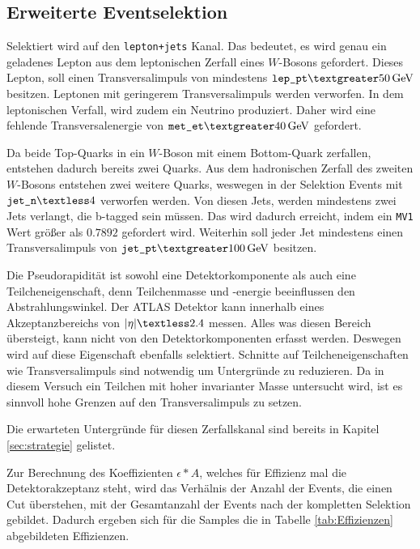 \subsection{Erweiterte Eventselektion}
\label{sec:aufgabe3}

Selektiert wird auf den \texttt{lepton+jets} Kanal. Das bedeutet, es wird genau 
ein geladenes Lepton aus dem leptonischen Zerfall eines $W$-Bosons gefordert. 
Dieses Lepton, soll einen Transversalimpuls von mindestens $\texttt{lep$\_$pt} \textgreater 
\SI{50}{\giga\electronvolt}$ besitzen. Leptonen mit geringerem Transversalimpuls 
werden verworfen. In dem leptonischen Verfall, wird zudem ein 
Neutrino produziert. Daher wird eine fehlende Transversalenergie von 
$\texttt{met$\_$et} \textgreater \SI{40}{\giga\electronvolt}$ gefordert. \par 
Da beide Top-Quarks in ein $W$-Boson mit einem Bottom-Quark zerfallen, entstehen
dadurch bereits zwei Quarks. Aus dem hadronischen Zerfall des zweiten $W$-Bosons 
entstehen zwei weitere Quarks, weswegen in der Selektion Events mit 
$\texttt{jet$\_$n} \textless 4$ verworfen werden. Von diesen Jets, werden 
mindestens zwei Jets verlangt, die b-tagged sein müssen. Das wird dadurch erreicht,
indem ein \texttt{MV1} Wert größer als $0.7892$ gefordert wird. Weiterhin soll 
jeder Jet mindestens einen Transversalimpuls von $\texttt{jet$\_$pt} 
\textgreater \SI{100}{\giga\electronvolt}$ besitzen. \par 
Die Pseudorapidität ist sowohl eine Detektorkomponente als auch eine 
Teilcheneigenschaft, denn Teilchenmasse und -energie beeinflussen den 
Abstrahlungswinkel. Der ATLAS Detektor kann innerhalb eines Akzeptanzbereichs 
von $|{\eta}| \textless 2.4$ messen. Alles was diesen Bereich übersteigt, 
kann nicht von den Detektorkomponenten erfasst werden. Deswegen wird auf 
diese Eigenschaft ebenfalls selektiert. Schnitte auf Teilcheneigenschaften 
wie Transversalimpuls sind notwendig um Untergründe zu reduzieren. Da in diesem 
Versuch ein Teilchen mit hoher invarianter Masse untersucht wird, ist es 
sinnvoll hohe Grenzen auf den Transversalimpuls zu setzen. \par 

Die erwarteten Untergründe für diesen Zerfallskanal sind bereits in 
Kapitel \ref{sec:strategie} gelistet. \par

Zur Berechnung des Koeffizienten $\epsilon * A$, welches für Effizienz mal die 
Detektorakzeptanz steht, wird das Verhälnis der Anzahl der Events, die einen 
Cut überstehen, 
mit der Gesamtanzahl der Events nach der kompletten Selektion gebildet. Dadurch 
ergeben sich für die Samples die in Tabelle \ref{tab:Effizienzen} abgebildeten 
Effizienzen.

